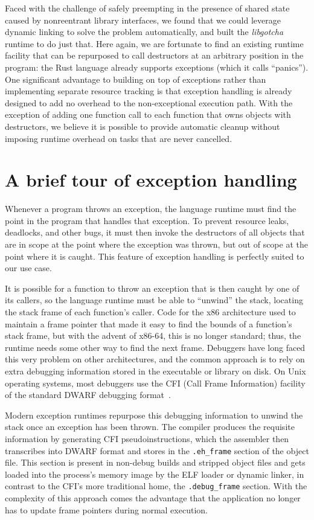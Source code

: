 Faced with the challenge of safely preempting in the presence of shared state caused
by nonreentrant library interfaces, we found that we could leverage dynamic linking
to solve the problem automatically, and built the \textit{libgotcha} runtime to do
just that.  Here again, we are fortunate to find an existing runtime facility that
can be repurposed to call destructors at an arbitrary position in the program:\@
the Rust language already supports exceptions (which it calls ``panics'').  One
significant advantage to building on top of exceptions rather than implementing
separate resource tracking is that exception handling is already designed to add no
overhead to the non-exceptional execution path.  With the exception of adding one
function call to each function that owns objects with destructors, we believe it is
possible to provide automatic cleanup without imposing runtime overhead on tasks that
are never cancelled.


\section{A brief tour of exception handling}

Whenever a program throws an exception, the language runtime must find the point in
the program that handles that exception.  To prevent resource leaks, deadlocks, and
other bugs, it must then invoke the destructors of all objects that are in scope at
the point where the exception was thrown, but out of scope at the point where it is
caught.  This feature of exception handling is perfectly suited to our use case.

It is possible for a function to throw an exception that is then caught by one of its
callers, so the language runtime must be able to ``unwind'' the stack, locating the
stack frame of each function's caller.  Code for the x86 architecture used to
maintain a frame pointer that made it easy to find the bounds of a function's stack
frame, but with the advent of x86-64, this is no longer standard; thus, the runtime
needs some other way to find the next frame.  Debuggers have long faced this very
problem on other architectures, and the common approach is to rely on extra debugging
information stored in the executable or library on disk.  On Unix operating
systems, most debuggers use the CFI (Call Frame Information) facility of the standard
DWARF debugging format~\cite{eager:spec2012}.

Modern exception runtimes repurpose this debugging information to unwind the stack
once an exception has been thrown.  The compiler produces the requisite information
by generating CFI pseudoinstructions, which the assembler then transcribes into DWARF
format and stores in the \texttt{.eh\_frame} section of the object file.  This
section is present in non-debug builds and stripped object files and gets loaded into
the process's memory image by the ELF loader or dynamic linker, in contrast to the
CFI's more traditional home, the \texttt{.debug\_frame} section.  With the complexity
of this approach comes the advantage that the application no longer has to update
frame pointers during normal execution.

